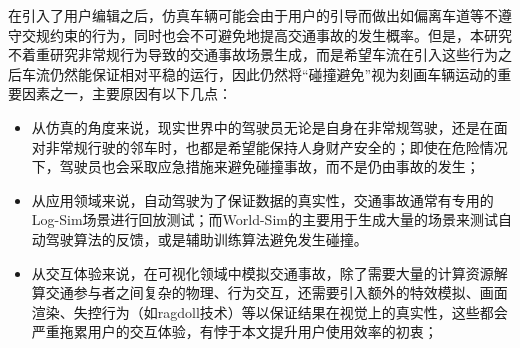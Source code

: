 在引入了用户编辑之后，仿真车辆可能会由于用户的引导而做出如偏离车道等不遵守交规约束的行为，同时也会不可避免地提高交通事故的发生概率。但是，本研究不着重研究非常规行为导致的交通事故场景生成，而是希望车流在引入这些行为之后车流仍然能保证相对平稳的运行，因此仍然将“碰撞避免”视为刻画车辆运动的重要因素之一，主要原因有以下几点：
\begin{itemize}
    \item 从仿真的角度来说，现实世界中的驾驶员无论是自身在非常规驾驶，还是在面对非常规行驶的邻车时，也都是希望能保持人身财产安全的；即使在危险情况下，驾驶员也会采取应急措施来避免碰撞事故，而不是仍由事故的发生；
    
    \item 从应用领域来说，自动驾驶为了保证数据的真实性，交通事故通常有专用的Log-Sim场景进行回放测试；而World-Sim的主要用于生成大量的场景来测试自动驾驶算法的反馈，或是辅助训练算法避免发生碰撞。

    \item 从交互体验来说，在可视化领域中模拟交通事故，除了需要大量的计算资源解算交通参与者之间复杂的物理、行为交互，还需要引入额外的特效模拟、画面渲染、失控行为（如ragdoll技术）等以保证结果在视觉上的真实性，这些都会严重拖累用户的交互体验，有悖于本文提升用户使用效率的初衷；
    
\end{itemize}




